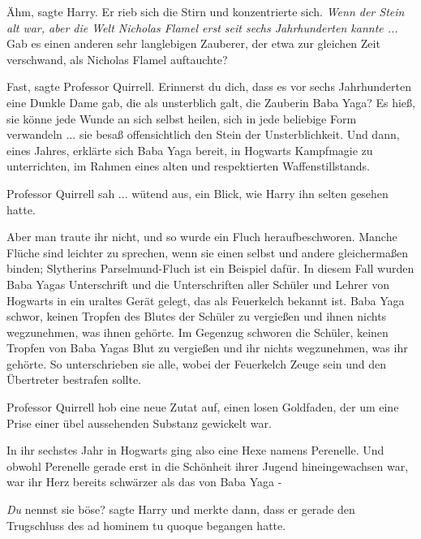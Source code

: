 \glqq{}Ähm\grqq{}, sagte Harry. Er rieb sich die Stirn und konzentrierte sich.
\emph{Wenn der Stein alt war, aber die Welt Nicholas Flamel erst seit sechs
Jahrhunderten kannte ...} \glqq{}Gab es einen anderen sehr langlebigen Zauberer,
der etwa zur gleichen Zeit verschwand, als Nicholas Flamel auftauchte?\grqq{}

\glqq{}Fast\grqq{}, sagte Professor Quirrell. \glqq{}Erinnerst du dich, dass es
vor sechs Jahrhunderten eine Dunkle Dame gab, die als unsterblich galt, die
Zauberin Baba Yaga? Es hieß, sie könne jede Wunde an sich selbst heilen, sich in
jede beliebige Form verwandeln ... sie besaß offensichtlich den Stein der
Unsterblichkeit. Und dann, eines Jahres, erklärte sich Baba Yaga bereit, in
Hogwarts Kampfmagie zu unterrichten, im Rahmen eines alten und respektierten
Waffenstillstands.\grqq{}

Professor Quirrell sah ... wütend aus, ein Blick, wie Harry ihn selten gesehen
hatte.

\glqq{}Aber man traute ihr nicht, und so wurde ein Fluch heraufbeschworen. Manche
Flüche sind leichter zu sprechen, wenn sie einen selbst und andere gleichermaßen
binden; Slytherins Parselmund-Fluch ist ein Beispiel dafür. In diesem Fall
wurden Baba Yagas Unterschrift und die Unterschriften aller Schüler und Lehrer
von Hogwarts in ein uraltes Gerät gelegt, das als Feuerkelch bekannt ist. Baba
Yaga schwor, keinen Tropfen des Blutes der Schüler zu vergießen und ihnen nichts
wegzunehmen, was ihnen gehörte. Im Gegenzug schworen die Schüler, keinen Tropfen
von Baba Yagas Blut zu vergießen und ihr nichts wegzunehmen, was ihr gehörte. So
unterschrieben sie alle, wobei der Feuerkelch Zeuge sein und den Übertreter
bestrafen sollte.\grqq{}

Professor Quirrell hob eine neue Zutat auf, einen losen Goldfaden, der um eine
Prise einer übel aussehenden Substanz gewickelt war.

\glqq{}In ihr sechstes Jahr in Hogwarts ging also eine Hexe namens Perenelle. Und
obwohl Perenelle gerade erst in die Schönheit ihrer Jugend hineingewachsen war,
war ihr Herz bereits schwärzer als das von Baba Yaga -\grqq{}

\glqq{}\emph{Du} nennst sie böse?\grqq{} sagte Harry und merkte dann, dass er
gerade den Trugschluss des ad hominem tu quoque begangen hatte.

